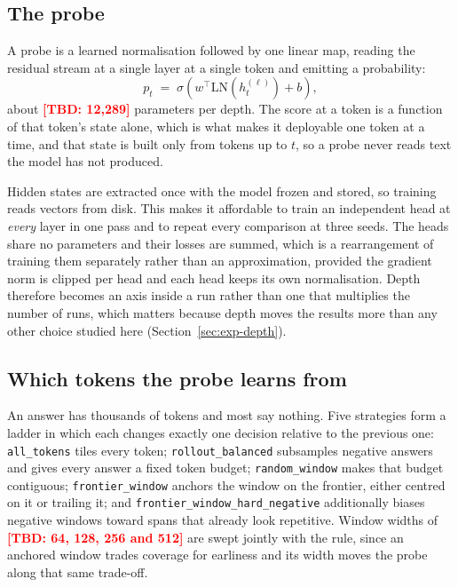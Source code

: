 \documentclass{article}
\newcommand{\TBD}[1]{\textcolor{red}{\textbf{[TBD: #1]}}}
\begin{document}
\subsection{The probe}
A probe is a learned normalisation followed by one linear map, reading the
residual stream at a single layer at a single token and emitting a probability:
\begin{equation}
  p_t \;=\; \sigma\!\left(w^{\top}\mathrm{LN}\!\left(h^{(\ell)}_t\right) + b\right),
\end{equation}
about \TBD{12{,}289} parameters per depth. The score at a token is a function of
that token's state alone, which is what makes it deployable one token at a time,
and that state is built only from tokens up to $t$, so a probe never reads text
the model has not produced.

Hidden states are extracted once with the model frozen and stored, so training
reads vectors from disk. This makes it affordable to train an independent head at
\emph{every} layer in one pass and to repeat every comparison at three seeds. The
heads share no parameters and their losses are summed, which is a rearrangement
of training them separately rather than an approximation, provided the gradient
norm is clipped per head and each head keeps its own normalisation. Depth
therefore becomes an axis inside a run rather than one that multiplies the number
of runs, which matters because depth moves the results more than any other choice
studied here (Section~\ref{sec:exp-depth}).

\subsection{Which tokens the probe learns from}
\label{sec:selection}
An answer has thousands of tokens and most say nothing. Five strategies form a
ladder in which each changes exactly one decision relative to the previous one:
\texttt{all\_tokens} tiles every token; \texttt{rollout\_balanced} subsamples
negative answers and gives every answer a fixed token budget;
\texttt{random\_window} makes that budget contiguous; \texttt{frontier\_window}
anchors the window on the frontier, either centred on it or trailing it; and
\texttt{frontier\_window\_hard\_negative} additionally biases negative windows
toward spans that already look repetitive. Window widths of \TBD{64, 128, 256 and
512} are swept jointly with the rule, since an anchored window trades coverage
for earliness and its width moves the probe along that same trade-off.
\end{document}
